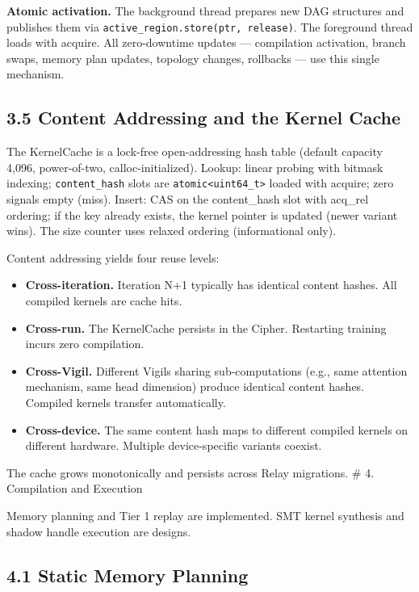 \textbf{Atomic activation.} The background thread prepares new DAG structures and publishes them via \texttt{active\_region.store(ptr,\ release)}. The foreground thread loads with acquire. All zero-downtime updates --- compilation activation, branch swaps, memory plan updates, topology changes, rollbacks --- use this single mechanism.

\subsection{3.5 Content Addressing and the Kernel Cache}\label{content-addressing-and-the-kernel-cache}

The KernelCache is a lock-free open-addressing hash table (default capacity 4,096, power-of-two, calloc-initialized). Lookup: linear probing with bitmask indexing; \texttt{content\_hash} slots are \texttt{atomic\textless{}uint64\_t\textgreater{}} loaded with acquire; zero signals empty (miss). Insert: CAS on the content\_hash slot with acq\_rel ordering; if the key already exists, the kernel pointer is updated (newer variant wins). The size counter uses relaxed ordering (informational only).

Content addressing yields four reuse levels:

\begin{itemize}
\tightlist
\item
  \textbf{Cross-iteration.} Iteration N+1 typically has identical content hashes. All compiled kernels are cache hits.
\item
  \textbf{Cross-run.} The KernelCache persists in the Cipher. Restarting training incurs zero compilation.
\item
  \textbf{Cross-Vigil.} Different Vigils sharing sub-computations (e.g., same attention mechanism, same head dimension) produce identical content hashes. Compiled kernels transfer automatically.
\item
  \textbf{Cross-device.} The same content hash maps to different compiled kernels on different hardware. Multiple device-specific variants coexist.
\end{itemize}

The cache grows monotonically and persists across Relay migrations.
\# 4. Compilation and Execution

Memory planning and Tier 1 replay are implemented. SMT kernel synthesis and shadow handle execution are designs.

\subsection{4.1 Static Memory Planning}\label{static-memory-planning}

